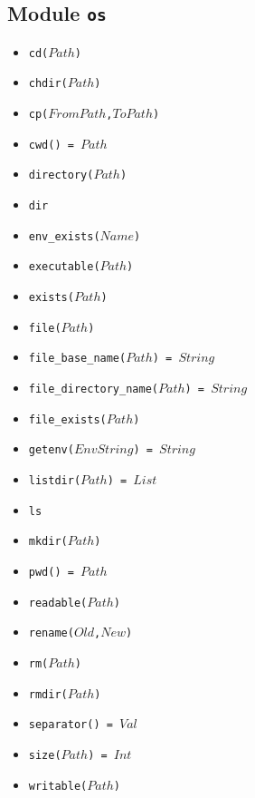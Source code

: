 \documentclass[10pt]{article}
\begin{document}
\begin{multicols}{2}
\section*{Module \texttt{os}}
\begin{scriptsize}
\begin{itemize}
\item \texttt{cd($Path$)}
\item \texttt{chdir($Path$)}
\item \texttt{cp($FromPath$,$ToPath$)}
\item \texttt{cwd() = $Path$}
\item \texttt{directory($Path$)}
\item \texttt{dir}
\item \texttt{env\_exists($Name$)}
\item \texttt{executable($Path$)}
\item \texttt{exists($Path$)}
\item \texttt{file($Path$)}
\item \texttt{file\_base\_name($Path$) = $String$}
\item \texttt{file\_directory\_name($Path$) = $String$}
\item \texttt{file\_exists($Path$)}
\item \texttt{getenv($EnvString$) = $String$}
\item \texttt{listdir($Path$) = $List$}
\item \texttt{ls}
\item \texttt{mkdir($Path$)}
\item \texttt{pwd() = $Path$}
\item \texttt{readable($Path$)}
\item \texttt{rename($Old$,$New$)}
\item \texttt{rm($Path$)}
\item \texttt{rmdir($Path$)}
\item \texttt{separator() = $Val$}
\item \texttt{size($Path$) = $Int$}
\item \texttt{writable($Path$)}


\end{itemize}
\end{scriptsize}
\end{multicols}
\end{document}
